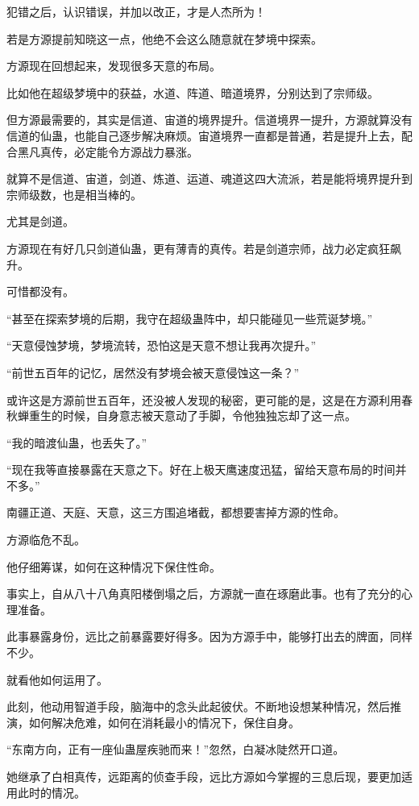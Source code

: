 \begin{this_body}
犯错之后，认识错误，并加以改正，才是人杰所为！

若是方源提前知晓这一点，他绝不会这么随意就在梦境中探索。

方源现在回想起来，发现很多天意的布局。

比如他在超级梦境中的获益，水道、阵道、暗道境界，分别达到了宗师级。

但方源最需要的，其实是信道、宙道的境界提升。信道境界一提升，方源就算没有信道的仙蛊，也能自己逐步解决麻烦。宙道境界一直都是普通，若是提升上去，配合黑凡真传，必定能令方源战力暴涨。

就算不是信道、宙道，剑道、炼道、运道、魂道这四大流派，若是能将境界提升到宗师级数，也是相当棒的。

尤其是剑道。

方源现在有好几只剑道仙蛊，更有薄青的真传。若是剑道宗师，战力必定疯狂飙升。

可惜都没有。

“甚至在探索梦境的后期，我守在超级蛊阵中，却只能碰见一些荒诞梦境。”

“天意侵蚀梦境，梦境流转，恐怕这是天意不想让我再次提升。”

“前世五百年的记忆，居然没有梦境会被天意侵蚀这一条？”

或许这是方源前世五百年，还没被人发现的秘密，更可能的是，这是在方源利用春秋蝉重生的时候，自身意志被天意动了手脚，令他独独忘却了这一点。

“我的暗渡仙蛊，也丢失了。”

“现在我等直接暴露在天意之下。好在上极天鹰速度迅猛，留给天意布局的时间并不多。”

南疆正道、天庭、天意，这三方围追堵截，都想要害掉方源的性命。

方源临危不乱。

他仔细筹谋，如何在这种情况下保住性命。

事实上，自从八十八角真阳楼倒塌之后，方源就一直在琢磨此事。也有了充分的心理准备。

此事暴露身份，远比之前暴露要好得多。因为方源手中，能够打出去的牌面，同样不少。

就看他如何运用了。

此刻，他动用智道手段，脑海中的念头此起彼伏。不断地设想某种情况，然后推演，如何解决危难，如何在消耗最小的情况下，保住自身。

“东南方向，正有一座仙蛊屋疾驰而来！”忽然，白凝冰陡然开口道。

她继承了白相真传，远距离的侦查手段，远比方源如今掌握的三息后现，要更加适用此时的情况。


\end{this_body}
